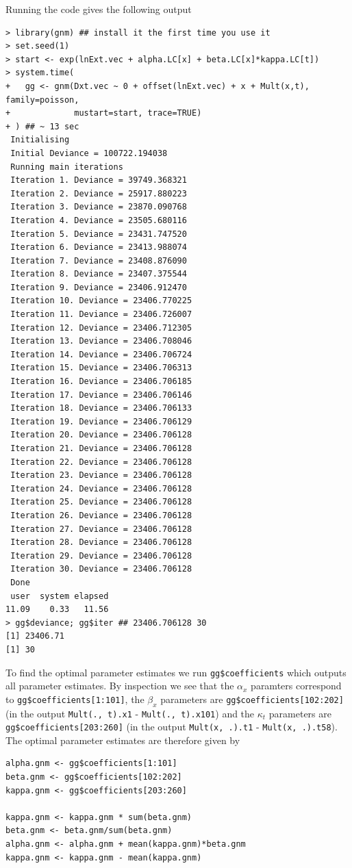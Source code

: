 \documentclass[11pt]{article}
\begin{document}
Running the code gives the following output
\begin{verbatim}
> library(gnm) ## install it the first time you use it
> set.seed(1)
> start <- exp(lnExt.vec + alpha.LC[x] + beta.LC[x]*kappa.LC[t])
> system.time(
+   gg <- gnm(Dxt.vec ~ 0 + offset(lnExt.vec) + x + Mult(x,t), family=poisson,
+             mustart=start, trace=TRUE)
+ ) ## ~ 13 sec
 Initialising
 Initial Deviance = 100722.194038
 Running main iterations
 Iteration 1. Deviance = 39749.368321
 Iteration 2. Deviance = 25917.880223
 Iteration 3. Deviance = 23870.090768
 Iteration 4. Deviance = 23505.680116
 Iteration 5. Deviance = 23431.747520
 Iteration 6. Deviance = 23413.988074
 Iteration 7. Deviance = 23408.876090
 Iteration 8. Deviance = 23407.375544
 Iteration 9. Deviance = 23406.912470
 Iteration 10. Deviance = 23406.770225
 Iteration 11. Deviance = 23406.726007
 Iteration 12. Deviance = 23406.712305
 Iteration 13. Deviance = 23406.708046
 Iteration 14. Deviance = 23406.706724
 Iteration 15. Deviance = 23406.706313
 Iteration 16. Deviance = 23406.706185
 Iteration 17. Deviance = 23406.706146
 Iteration 18. Deviance = 23406.706133
 Iteration 19. Deviance = 23406.706129
 Iteration 20. Deviance = 23406.706128
 Iteration 21. Deviance = 23406.706128
 Iteration 22. Deviance = 23406.706128
 Iteration 23. Deviance = 23406.706128
 Iteration 24. Deviance = 23406.706128
 Iteration 25. Deviance = 23406.706128
 Iteration 26. Deviance = 23406.706128
 Iteration 27. Deviance = 23406.706128
 Iteration 28. Deviance = 23406.706128
 Iteration 29. Deviance = 23406.706128
 Iteration 30. Deviance = 23406.706128
 Done
 user  system elapsed 
11.09    0.33   11.56 
> gg$deviance; gg$iter ## 23406.706128 30
[1] 23406.71
[1] 30
\end{verbatim}

To find the optimal parameter estimates we run \verb|gg$coefficients| which outputs all parameter estimates. By inspection we see that the $\alpha_x$ paramters correspond to \verb|gg$coefficients[1:101]|, the $\beta_x$ parameters are \verb|gg$coefficients[102:202]| (in the output \verb|Mult(., t).x1| - \verb|Mult(., t).x101|) and the $\kappa_t$ parameters are \verb|gg$coefficients[203:260]| (in the output \verb|Mult(x, .).t1| - \verb|Mult(x, .).t58|). The optimal parameter estimates are therefore given by 
\begin{verbatim}
alpha.gnm <- gg$coefficients[1:101]
beta.gnm <- gg$coefficients[102:202]
kappa.gnm <- gg$coefficients[203:260]

kappa.gnm <- kappa.gnm * sum(beta.gnm)
beta.gnm <- beta.gnm/sum(beta.gnm)
alpha.gnm <- alpha.gnm + mean(kappa.gnm)*beta.gnm
kappa.gnm <- kappa.gnm - mean(kappa.gnm)
\end{verbatim}
\end{document}

